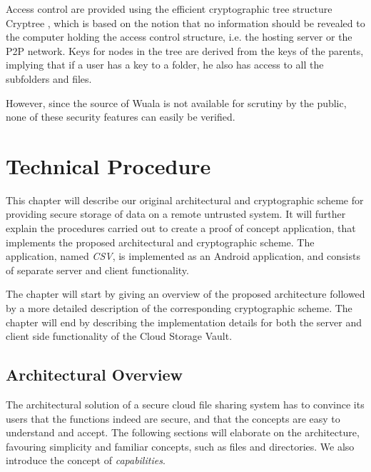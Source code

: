 \documentclass[pdftex,english,10pt,b5paper,twoside]{book}
\begin{document}
Access control are provided using the efficient cryptographic tree structure
Cryptree \cite{cryptree, wuala}, which is based on the notion that no
information should be revealed to the computer holding the access control
structure, i.e. the hosting server or the \ac{P2P} network. Keys for nodes in
the tree are derived from the keys of the parents, implying that if a user has
a key to a folder, he also has access to all the subfolders and files.

However, since the source of Wuala is not available for scrutiny by the public, none of
these security features can easily be verified.



\chapter{Technical Procedure}
\label{ch:technical}

This chapter will describe our original architectural and cryptographic
scheme for providing secure storage of data on a remote untrusted system. It will
further explain the procedures carried out to create a proof of concept
application, that implements the proposed architectural and cryptographic
scheme. The application, named \emph{\ac{CSV}}, is implemented as an
Android application, and consists of separate server and client functionality.

The chapter will start by giving an overview of the proposed architecture
followed by a more detailed description of the corresponding cryptographic
scheme. The chapter will end by describing the implementation details for both
the server and client side functionality of the Cloud Storage Vault.

\section{Architectural Overview}
\label{chap:AS}

The architectural solution of a secure cloud file sharing system has to
convince its users that the functions indeed are secure, and that the concepts
are easy to understand and accept. The following sections will elaborate on the
architecture, favouring simplicity and familiar concepts, such as files and
directories. We also introduce the concept of \emph{capabilities}.
\end{document}
